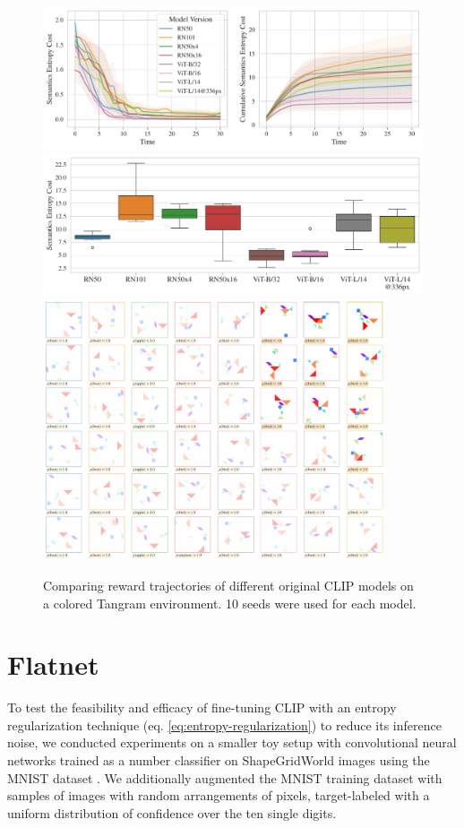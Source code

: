 \begin{figure}[h]
    \centering    
    \includegraphics[width=\textwidth]{images/model_comparison_color.pdf}
    \includegraphics[width=\textwidth]{images/model_comparison_boxplot_color.pdf}
    \includegraphics[width=0.9\textwidth]{images/model_samples_color.pdf}
    \caption{Comparing reward trajectories of different original CLIP models on a colored Tangram environment. 10 seeds were used for each model.}    
\end{figure}


\chapter{Flatnet}
\label{sec:flatnet}
To test the feasibility and efficacy of fine-tuning CLIP with an entropy regularization technique (eq. \ref{eq:entropy-regularization}) to reduce its inference noise, we conducted experiments on a smaller toy setup with convolutional neural networks trained as a number classifier on ShapeGridWorld images using the MNIST dataset \citep{mnist}.
We additionally augmented the MNIST training dataset with samples of images with random arrangements of pixels, target-labeled with a uniform distribution of confidence over the ten single digits.

